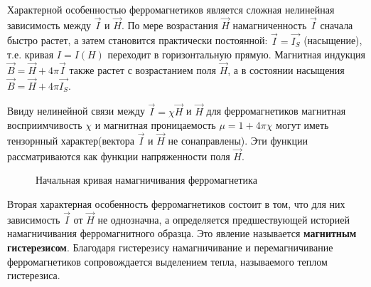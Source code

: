 \documentclass[a4paper,14pt]{article} %
\begin{document}
Характерной особенностью ферромагнетиков является сложная нелинейная зависимость между $\overrightarrow{I}$ и $\overrightarrow{H}$. По мере возрастания $\overrightarrow{H}$ намагниченность $\overrightarrow{I}$ сначала быстро растет, а затем становится практически постоянной: $\overrightarrow{I} = \overrightarrow{I_S}$ (насыщение), т.е. кривая $I = I(H)$ переходит в горизонтальную прямую. Магнитная индукция $\overrightarrow{B} = \overrightarrow{H} + 4\pi\overrightarrow{I}$ также растет с возрастанием поля $\overrightarrow{H}$, а в состоянии насыщения $\overrightarrow{B} = \overrightarrow{H} + 4\pi\overrightarrow{I_S}$.

Ввиду нелинейной связи между $\overrightarrow{I} = \chi\overrightarrow{H}$ и $\overrightarrow{H}$ для ферромагнетиков магнитная восприимчивость $\chi$ и магнитная проницаемость $\mu = 1 + 4\pi\chi$ могут иметь тензорнный характер(вектора $\overrightarrow{I}$ и $\overrightarrow{H}$ не сонаправлены). Эти функции рассматриваются как функции напряженности поля $\overrightarrow{H}$.

\begin{figure}[H]
	\caption{Начальная кривая намагничивания ферромагнетика}
\end{figure}

Вторая характерная особенность ферромагнетиков состоит в том, что для них зависимость $\overrightarrow{I}$ от $\overrightarrow{H}$ не однозначна, а определяется предшествующей историей намагничивания ферромагнитного образца. Это явление называется \textbf{магнитным гистерезисом}. Благодаря гистерезису намагничивание и перемагничивание ферромагнетиков сопровождается выделением тепла, называемого теплом гистерезиса.
\end{document}
